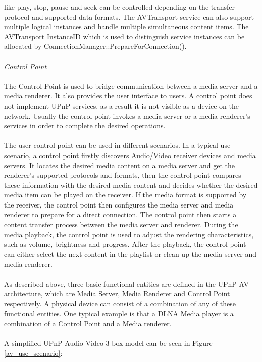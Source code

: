 like play, stop, pause and seek can be controlled depending on the transfer 
protocol and supported data formats. The AVTransport service can also support 
multiple logical instances and handle multiple simultaneous content items. The 
AVTransport InstanceID which is used to distinguish service instances can be 
allocated by ConnectionManager::PrepareForConnection(). \\
\\
\emph{Control Point} \\ 
\\
The Control Point is used to bridge communication between a media server and a media renderer. 
It also provides the user interface to users. A control point does not implement UPnP 
services, as a result it is not visible as a device on the network. Usually the control point 
invokes a media server or a media renderer's services in order to complete the 
desired operations.\\
\\
The user control point can be used in different scenarios. In a typical use
scenario, a control point firstly discovers Audio/Video receiver devices and
media servers. It locates the desired media content on a media server and get
the renderer's supported protocols and formats, then the control point compares
these information with the desired media content and decides whether the desired
media item can be played on the receiver. If the media format is supported by
the receiver, the control point then configures the media server and media
renderer to prepare for a direct connection. The control point then starts a
content transfer process between the media server and renderer. During the
media playback, the control point is used to adjust the rendering
characteristics, such as volume, brightness and progress. After the playback,
the control point can either select the next content in the playlist or clean up
the media server and media renderer.\\
\\ 
As described above, three basic functional entities are defined in the UPnP AV 
architecture\cite{upnp-av}, which are Media Server, Media Renderer and Control Point respectively.
A physical device can consist of a combination of any of these functional 
entities. One typical example is that a DLNA Media player is a combination of a Control 
Point and a Media renderer. \\
\\
A simplified UPnP Audio Video 3-box model \cite{DLNA_proxy} can be 
seen in Figure \ref{av_use_scenario}: 

